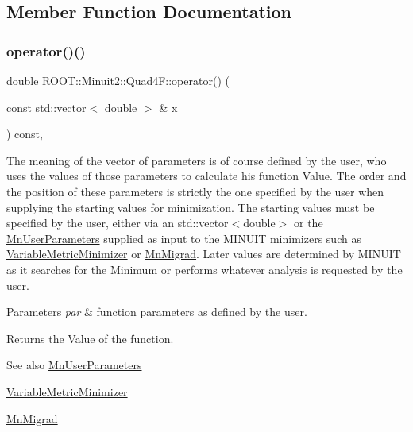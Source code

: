\subsection{Member Function Documentation}
\mbox{\label{classROOT_1_1Minuit2_1_1Quad4F_a41964a71fa65445e18c041fbdc724a03}} 
\subsubsection{\texorpdfstring{operator()()}{operator()()}\hspace{0.1cm}{\footnotesize\ttfamily [1/2]}}
{\footnotesize\ttfamily double R\+O\+O\+T\+::\+Minuit2\+::\+Quad4\+F\+::operator() (\begin{DoxyParamCaption}\item[{const std\+::vector$<$ double $>$ \&}]{x }\end{DoxyParamCaption}) const\hspace{0.3cm}{\ttfamily [inline]}, {\ttfamily [virtual]}}

The meaning of the vector of parameters is of course defined by the user, who uses the values of those parameters to calculate his function Value. The order and the position of these parameters is strictly the one specified by the user when supplying the starting values for minimization. The starting values must be specified by the user, either via an std\+::vector$<$double$>$ or the \mbox{\hyperlink{classROOT_1_1Minuit2_1_1MnUserParameters}{Mn\+User\+Parameters}} supplied as input to the M\+I\+N\+U\+IT minimizers such as \mbox{\hyperlink{classROOT_1_1Minuit2_1_1VariableMetricMinimizer}{Variable\+Metric\+Minimizer}} or \mbox{\hyperlink{classROOT_1_1Minuit2_1_1MnMigrad}{Mn\+Migrad}}. Later values are determined by M\+I\+N\+U\+IT as it searches for the Minimum or performs whatever analysis is requested by the user.


\begin{DoxyParams}{Parameters}
{\em par} & function parameters as defined by the user.\\
\hline
\end{DoxyParams}
\begin{DoxyReturn}{Returns}
the Value of the function.
\end{DoxyReturn}
\begin{DoxySeeAlso}{See also}
\mbox{\hyperlink{classROOT_1_1Minuit2_1_1MnUserParameters}{Mn\+User\+Parameters}} 

\mbox{\hyperlink{classROOT_1_1Minuit2_1_1VariableMetricMinimizer}{Variable\+Metric\+Minimizer}} 

\mbox{\hyperlink{classROOT_1_1Minuit2_1_1MnMigrad}{Mn\+Migrad}} 
\end{DoxySeeAlso}


